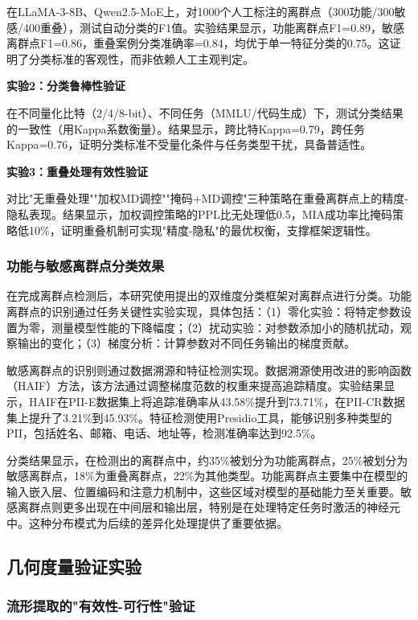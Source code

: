 在LLaMA-3-8B、Qwen2.5-MoE上，对1000个人工标注的离群点（300功能/300敏感/400重叠），测试自动分类的F1值。实验结果显示，功能离群点F1=0.89，敏感离群点F1=0.86，重叠案例分类准确率=0.84，均优于单一特征分类的0.75。这证明了分类标准的客观性，而非依赖人工主观判定。

\textbf{实验2：分类鲁棒性验证}

在不同量化比特（2/4/8-bit）、不同任务（MMLU/代码生成）下，测试分类结果的一致性（用Kappa系数衡量）。结果显示，跨比特Kappa=0.79，跨任务Kappa=0.76，证明分类标准不受量化条件与任务类型干扰，具备普适性。

\textbf{实验3：重叠处理有效性验证}

对比"无重叠处理""加权MD调控""掩码+MD调控"三种策略在重叠离群点上的精度-隐私表现。结果显示，加权调控策略的PPL比无处理低0.5，MIA成功率比掩码策略低10\%，证明重叠机制可实现"精度-隐私"的最优权衡，支撑框架逻辑性。

\subsubsection{功能与敏感离群点分类效果}

在完成离群点检测后，本研究使用提出的双维度分类框架对离群点进行分类。功能离群点的识别通过任务关键性实验实现，具体包括：（1）零化实验：将特定参数设置为零，测量模型性能的下降幅度；（2）扰动实验：对参数添加小的随机扰动，观察输出的变化；（3）梯度分析：计算参数对不同任务输出的梯度贡献。

敏感离群点的识别则通过数据溯源和特征检测实现。数据溯源使用改进的影响函数（HAIF）方法，该方法通过调整梯度范数的权重来提高追踪精度。实验结果显示，HAIF在PII-E数据集上将追踪准确率从43.58\%提升到73.71\%，在PII-CR数据集上提升了3.21\%到45.93\%。特征检测使用Presidio工具，能够识别多种类型的PII，包括姓名、邮箱、电话、地址等，检测准确率达到92.5\%。

分类结果显示，在检测出的离群点中，约35\%被划分为功能离群点，25\%被划分为敏感离群点，18\%为重叠离群点，22\%为其他类型。功能离群点主要集中在模型的输入嵌入层、位置编码和注意力机制中，这些区域对模型的基础能力至关重要。敏感离群点则更多出现在中间层和输出层，特别是在处理特定任务时激活的神经元中。这种分布模式为后续的差异化处理提供了重要依据。

\subsection{几何度量验证实验}

\subsubsection{流形提取的"有效性-可行性"验证}

